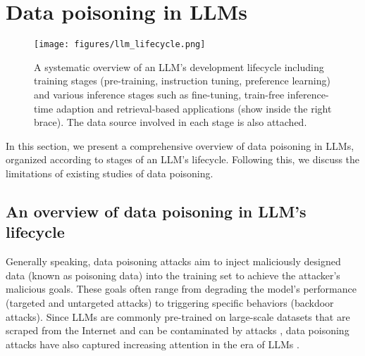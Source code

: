 \section{Data poisoning in LLMs} \label{section:2}

\begin{figure*}[t]
    \centering
    \texttt{[image: figures/llm\_lifecycle.png]}
    \vspace{-15pt}
    \caption{A systematic overview of an LLM's development lifecycle including training stages (pre-training, instruction tuning, preference learning) and various inference stages such as fine-tuning, train-free inference-time adaption and retrieval-based applications (show inside the right brace). The data source involved in each stage is also attached.}
    \label{fig:lifecycle}
\end{figure*}
In this section, we present a comprehensive overview of data poisoning in LLMs, organized according to stages of an LLM's lifecycle. Following this, we discuss the limitations of existing studies of data poisoning. 

\vspace{+20pt}

\subsection{An overview of data poisoning in LLM's lifecycle}\label{sec:lifecycle}

Generally speaking, data poisoning attacks aim to inject maliciously designed data (known as poisoning data) into the training set to achieve the attacker's malicious goals. These goals often range from degrading the model's performance (targeted and untargeted attacks)\citep{shafahi2018poison,fowl2021adversarial} to triggering specific behaviors (backdoor attacks)\citep{schwarzschild2021just,gu2019badnets}. Since LLMs are commonly pre-trained on large-scale datasets that are scraped from the Internet and can be contaminated by attacks \citep{carlini2024poisoning}, data poisoning attacks have also captured increasing attention in the era of LLMs \citep{wan2023poisoning, he2024datapoisoningincontextlearning}.
 
